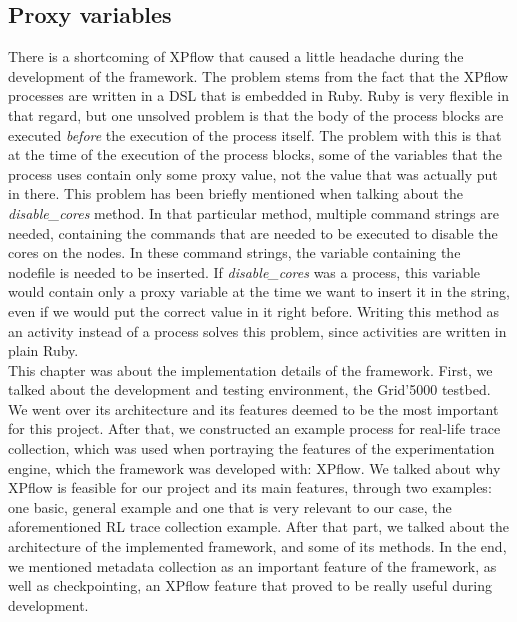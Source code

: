 \subsection{Proxy variables}
\label{sec:proxy_variables}
There is a shortcoming of XPflow that caused a little headache during
the development of the framework. The problem stems from
the fact that the XPflow processes are written in a DSL that is
embedded in Ruby. Ruby is very
flexible in that regard, but one unsolved problem is that the body of
the process blocks are executed \emph{before} the execution of the
process itself. The problem with this is that at the time of the
execution of the process blocks, some of the variables that the
process uses contain only some proxy value, not the value that
was actually put in there. This problem has been briefly mentioned when
talking about the \emph{disable\_cores} method. In that particular
method, multiple command strings are needed, containing the commands
that are needed to be executed to disable the cores on the nodes. In
these command strings, the variable containing the nodefile is needed
to be inserted. If \emph{disable\_cores} was a process, this variable
would contain only a proxy variable at the
time we want to insert it in the string, even if we would put the
correct value in it right before. Writing this method as an activity
instead of a process solves this problem, since activities are written
in plain Ruby.\\[0.5cm]
This chapter was about the implementation details of the
framework. First, we talked about the development and testing
environment, the Grid'5000 testbed. We went over its architecture and
its features deemed to be the most important for this project. After
that, we constructed an example process for real-life trace
collection, which was used when portraying the features of the
experimentation engine, which the framework was developed with:
XPflow. We talked about why XPflow is feasible for our project and its
main features, through two examples: one basic, general example and
one that is very relevant to our case, the aforementioned RL trace
collection example. After that part, we talked about the architecture
of the implemented framework, and some of its methods. In the end, we
mentioned metadata collection as an important feature of the
framework, as well as checkpointing, an XPflow feature that proved to
be really useful during development.
